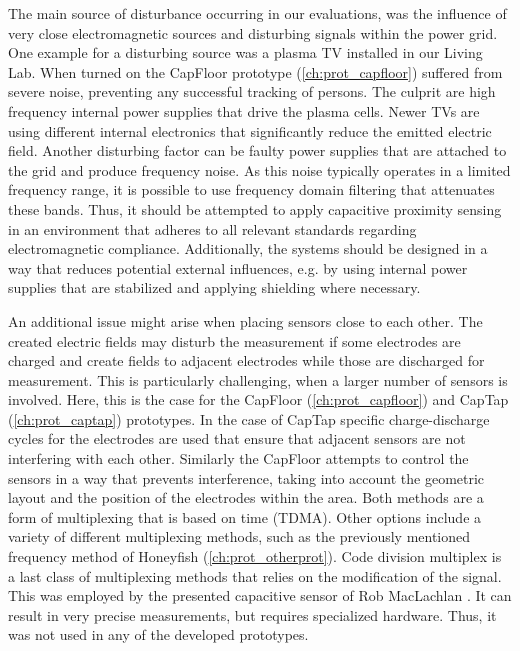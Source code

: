The main source of disturbance occurring in our evaluations, was the influence of very close electromagnetic sources and disturbing signals within the power grid. One example for a disturbing source was a plasma TV installed in our Living Lab. When turned on the CapFloor prototype (\ref{ch:prot_capfloor}) suffered from severe noise, preventing any successful tracking of persons. The culprit are high frequency internal power supplies that drive the plasma cells. Newer TVs are using different internal electronics that significantly reduce the emitted electric field. Another disturbing factor can be faulty power supplies that are attached to the grid and produce frequency noise. As this noise typically operates in a limited frequency range, it is possible to use frequency domain filtering that attenuates these bands. Thus, it should be attempted to apply capacitive proximity sensing in an environment that adheres to all relevant standards regarding electromagnetic compliance. Additionally, the systems should be designed in a way that reduces potential external influences, e.g. by using internal power supplies that are stabilized and applying shielding where necessary. 
 
An additional issue might arise when placing sensors close to each other. The created electric fields may disturb the measurement if some electrodes are charged and create fields to adjacent electrodes while those are discharged for measurement. This is particularly challenging, when a larger number of sensors is involved. Here, this is the case for the CapFloor (\ref{ch:prot_capfloor}) and CapTap (\ref{ch:prot_captap}) prototypes. In the case of CapTap specific charge-discharge cycles for the electrodes are used that ensure that adjacent sensors are not interfering with each other. Similarly the CapFloor attempts to control the sensors in a way that prevents interference, taking into account the geometric layout and the position of the electrodes within the area. Both methods are a form of multiplexing that is based on time (TDMA). Other options include a variety of different multiplexing methods, such as the previously mentioned frequency method of Honeyfish (\ref{ch:prot_otherprot}). Code division multiplex is a last class of multiplexing methods that relies on the modification of the signal. This was employed by the presented capacitive sensor of Rob MacLachlan \cite{MacLachlan2004}. It can result in very precise measurements, but requires specialized hardware. Thus, it was not used in any of the developed prototypes.

